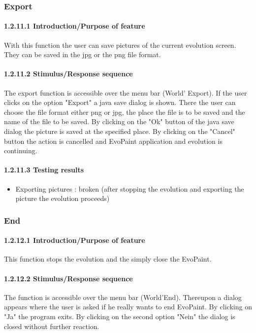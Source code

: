 \documentclass[titlepage,12pt]{scrartcl}
\begin{document}
\subsubsection{Export}
\paragraph{1.2.11.1 Introduction/Purpose of feature}
With this function the user can save pictures of the current evolution screen. They can be saved in the jpg or the png file format.
\paragraph{1.2.11.2 Stimulus/Response sequence}
The export function is accessible over the menu bar (World' Export). If the user clicks on the option "Export" a java save dialog is shown. There the user can choose the file format either png or jpg, the place the file is to be saved and the name of the file to be saved. By clicking on the "Ok" button of the java save dialog the picture is saved at the specified place. By clicking on the "Cancel" button the action is cancelled and EvoPaint application and evolution is continuing.
\paragraph{1.2.11.3 Testing results}
\begin{itemize}
	\item Exporting pictures 	: broken (after stopping the evolution and exporting the picture the evolution proceeds)
\end{itemize}

\subsubsection{End}
\paragraph{1.2.12.1 Introduction/Purpose of feature}
This function stops the evolution and the simply close the EvoPaint.
\paragraph{1.2.12.2 Stimulus/Response sequence}
The function is accessible over the menu bar (World'End). Thereupon a dialog appears where the user is asked if he really wants to end EvoPaint. By clicking on "Ja" the program exits. By clicking on the second option "Nein" the dialog is closed without further reaction.
\end{document}
